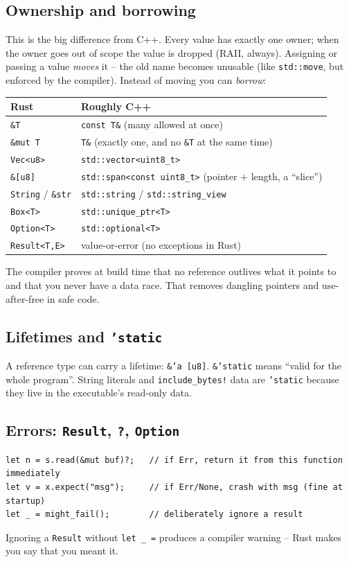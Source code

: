 \documentclass[11pt]{article}
\begin{document}
\subsection{Ownership and borrowing}
This is the big difference from C++. Every value has exactly one owner; when the owner goes out of scope the value is dropped (RAII, always). Assigning or passing a value \emph{moves} it -- the old name becomes unusable (like \texttt{std::move}, but enforced by the compiler). Instead of moving you can \emph{borrow}:

\begin{center}\begin{tabular}{ll}\toprule
Rust & Roughly C++ \\\midrule
\texttt{\&T} & \texttt{const T\&} (many allowed at once) \\
\texttt{\&mut T} & \texttt{T\&} (exactly one, and no \texttt{\&T} at the same time) \\
\texttt{Vec<u8>} & \texttt{std::vector<uint8\_t>} \\
\texttt{\&[u8]} & \texttt{std::span<const uint8\_t>} (pointer + length, a ``slice'') \\
\texttt{String} / \texttt{\&str} & \texttt{std::string} / \texttt{std::string\_view} \\
\texttt{Box<T>} & \texttt{std::unique\_ptr<T>} \\
\texttt{Option<T>} & \texttt{std::optional<T>} \\
\texttt{Result<T,E>} & value-or-error (no exceptions in Rust) \\
\bottomrule\end{tabular}\end{center}

The compiler proves at build time that no reference outlives what it points to and that you never have a data race. That removes dangling pointers and use-after-free in safe code.

\subsection{Lifetimes and \texttt{'static}}
A reference type can carry a lifetime: \texttt{\&'a [u8]}. \texttt{\&'static} means ``valid for the whole program''. String literals and \texttt{include\_bytes!} data are \texttt{'static} because they live in the executable's read-only data.

\subsection{Errors: \texttt{Result}, \texttt{?}, \texttt{Option}}
\begin{lstlisting}
let n = s.read(&mut buf)?;   // if Err, return it from this function immediately
let v = x.expect("msg");     // if Err/None, crash with msg (fine at startup)
let _ = might_fail();        // deliberately ignore a result
\end{lstlisting}
Ignoring a \texttt{Result} without \texttt{let \_ =} produces a compiler warning -- Rust makes you say that you meant it.
\end{document}
